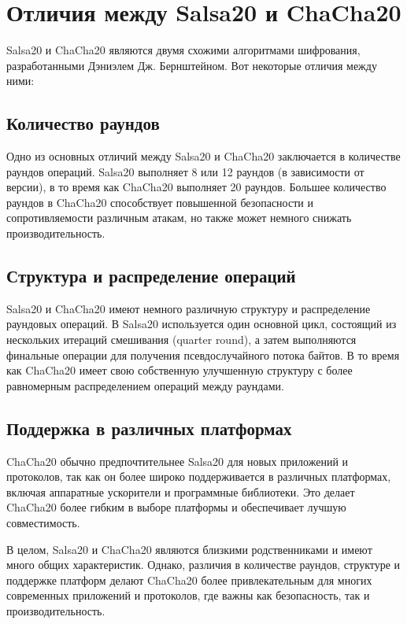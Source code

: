 \documentclass[12pt]{article}
\begin{document}
    \newpage


    \newpage


    \section{Отличия между Salsa20 и ChaCha20}

    Salsa20 и ChaCha20 являются двумя схожими алгоритмами шифрования, разработанными Дэниэлем Дж. Бернштейном. Вот некоторые отличия между ними:

    \subsection{Количество раундов}

    Одно из основных отличий между Salsa20 и ChaCha20 заключается в количестве раундов операций.
    Salsa20 выполняет 8 или 12 раундов (в зависимости от версии), в то время как ChaCha20 выполняет 20 раундов.
    Большее количество раундов в ChaCha20 способствует повышенной безопасности и сопротивляемости различным атакам, но также может немного снижать производительность.

    \subsection{Структура и распределение операций}

    Salsa20 и ChaCha20 имеют немного различную структуру и распределение раундовых операций.
    В Salsa20 используется один основной цикл, состоящий из нескольких итераций смешивания (quarter round), а затем выполняются финальные операции для получения псевдослучайного потока байтов. В то время как ChaCha20 имеет свою собственную улучшенную структуру с более равномерным распределением операций между раундами.

    \subsection{Поддержка в различных платформах}

    ChaCha20 обычно предпочтительнее Salsa20 для новых приложений и протоколов, так как он более широко поддерживается в различных платформах, включая аппаратные ускорители и программные библиотеки. Это делает ChaCha20 более гибким в выборе платформы и обеспечивает лучшую совместимость.

    В целом, Salsa20 и ChaCha20 являются близкими родственниками и имеют много общих характеристик.
    Однако, различия в количестве раундов, структуре и поддержке платформ делают ChaCha20 более привлекательным для многих современных приложений и протоколов, где важны как безопасность, так и производительность.
\end{document}

